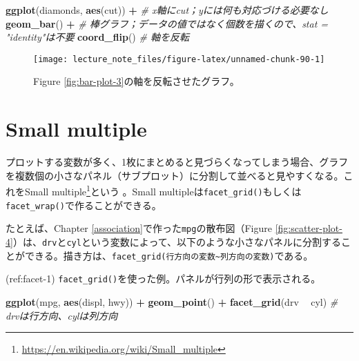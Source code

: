 \documentclass[]{book}
\newenvironment{Shaded}{\begin{snugshade}}{\end{snugshade}}
\newcommand{\KeywordTok}[1]{\textcolor[rgb]{0.13,0.29,0.53}{\textbf{#1}}}
\newcommand{\StringTok}[1]{\textcolor[rgb]{0.31,0.60,0.02}{#1}}
\newcommand{\CommentTok}[1]{\textcolor[rgb]{0.56,0.35,0.01}{\textit{#1}}}
\newcommand{\OperatorTok}[1]{\textcolor[rgb]{0.81,0.36,0.00}{\textbf{#1}}}
\newcommand{\NormalTok}[1]{#1}
\let\rmarkdownfootnote\footnote%
\def\footnote{\protect\rmarkdownfootnote}
\begin{document}
\begin{Shaded}
\begin{Highlighting}[]
\KeywordTok{ggplot}\NormalTok{(diamonds, }\KeywordTok{aes}\NormalTok{(cut)) }\OperatorTok{+}\StringTok{ }\CommentTok{# x軸にcut；yには何も対応づける必要なし}
\StringTok{  }\KeywordTok{geom_bar}\NormalTok{() }\OperatorTok{+}\StringTok{ }\CommentTok{# 棒グラフ；データの値ではなく個数を描くので、stat = "identity"は不要}
\StringTok{  }\KeywordTok{coord_flip}\NormalTok{() }\CommentTok{# 軸を反転}
\end{Highlighting}
\end{Shaded}

\begin{figure}

{\centering \texttt{[image: lecture\_note\_files/figure-latex/unnamed-chunk-90-1]} 

}

\caption{Figure \ref{fig:bar-plot-3}の軸を反転させたグラフ。}\label{fig:unnamed-chunk-90}
\end{figure}

\section{Small multiple}\label{small-multiple}

プロットする変数が多く、1枚にまとめると見づらくなってしまう場合、グラフを複数個の小さなパネル（サブプロット）に分割して並べると見やすくなる。これをSmall
multiple\footnote{\url{https://en.wikipedia.org/wiki/Small_multiple}}という
。Small
multipleは\texttt{facet\_grid()}もしくは\texttt{facet\_wrap()}で作ることができる。

たとえば、Chapter \ref{association}で作った\texttt{mpg}の散布図（Figure
\ref{fig:scatter-plot-4}）は、\texttt{drv}と\texttt{cyl}という変数によって、以下のような小さなパネルに分割することができる。描き方は、\texttt{facet\_grid(行方向の変数\textasciitilde{}列方向の変数)}である。

(ref:facet-1)
\texttt{facet\_grid()}を使った例。パネルが行列の形で表示される。

\begin{Shaded}
\begin{Highlighting}[]
\KeywordTok{ggplot}\NormalTok{(mpg, }\KeywordTok{aes}\NormalTok{(displ, hwy)) }\OperatorTok{+}
\StringTok{  }\KeywordTok{geom_point}\NormalTok{() }\OperatorTok{+}
\StringTok{  }\KeywordTok{facet_grid}\NormalTok{(drv }\OperatorTok{~}\StringTok{ }\NormalTok{cyl) }\CommentTok{# drvは行方向、cylは列方向}
\end{Highlighting}
\end{Shaded}
\end{document}

